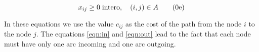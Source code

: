 \begin{equation}
	x_{ij}\ge 0 \; \text{intero} , \quad (i, j) \in A
	\tag{{\theequation}e}
\end{equation}

In these equations we use the value $c_{ij}$ as the cost of the path from the node $i$ to the node $j$. The equations \ref{eqn:in} and \ref{eqn:out} lead to the fact that each node must have only one arc incoming and one arc outgoing. 
